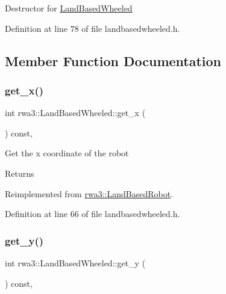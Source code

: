 Destructor for \hyperlink{classrwa3_1_1_land_based_wheeled}{Land\+Based\+Wheeled} 

Definition at line 78 of file landbasedwheeled.\+h.



\subsection{Member Function Documentation}
\mbox{\label{classrwa3_1_1_land_based_wheeled_a71d85c53a65516d08728284e27107f65}} 
\subsubsection{\texorpdfstring{get\+\_\+x()}{get\_x()}}
{\footnotesize\ttfamily int rwa3\+::\+Land\+Based\+Wheeled\+::get\+\_\+x (\begin{DoxyParamCaption}{ }\end{DoxyParamCaption}) const\hspace{0.3cm}{\ttfamily [inline]}, {\ttfamily [virtual]}}

Get the x coordinate of the robot \begin{DoxyReturn}{Returns}

\end{DoxyReturn}


Reimplemented from \hyperlink{classrwa3_1_1_land_based_robot_af47bec53268bd409305d2f97f45411ab}{rwa3\+::\+Land\+Based\+Robot}.



Definition at line 66 of file landbasedwheeled.\+h.

\mbox{\label{classrwa3_1_1_land_based_wheeled_ac16ccd003eae45997e00b4eee71bae3f}} 
\subsubsection{\texorpdfstring{get\+\_\+y()}{get\_y()}}
{\footnotesize\ttfamily int rwa3\+::\+Land\+Based\+Wheeled\+::get\+\_\+y (\begin{DoxyParamCaption}{ }\end{DoxyParamCaption}) const\hspace{0.3cm}{\ttfamily [inline]}, {\ttfamily [virtual]}}

